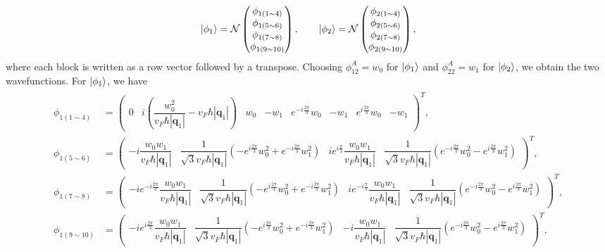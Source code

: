 \documentclass[10pt, oneside]{article}
\newcommand{\p}[1]{\left(#1\right)}
\newcommand{\bv}[1]{\left|#1\right|}
\begin{document}
\begin{align}
	\ket{\phi_1}
	=
	\mathcal{N}
	\begin{pmatrix}
		\phi_{1(1 \sim 4)} \\
		\phi_{1(5 \sim 6)} \\
		\phi_{1(7 \sim 8)} \\
		\phi_{1(9 \sim 10)}
	\end{pmatrix},
	\qquad
	\ket{\phi_2}
	=
	\mathcal{N}
	\begin{pmatrix}
		\phi_{2(1 \sim 4)} \\
		\phi_{2(5 \sim 6)} \\
		\phi_{2(7 \sim 8)} \\
		\phi_{2(9 \sim 10)}
	\end{pmatrix},
\end{align}
where each block is written as a row vector followed by a transpose. Choosing \(\phi_{12}^{A}=w_0\) for \(\ket{\phi_1}\) and \(\phi_{22}^{A}=w_1\) for \(\ket{\phi_2}\), we obtain the two wavefunctions. For \(\ket{\phi_1}\), we have
\begin{align}
	\begin{split}
		\phi_{1(1 \sim 4)}
	&=
	\begin{pmatrix}
		0 &
		i \p{\dfrac{w_{0}^{2}}{v_F \hbar \bv{\bm{q}_1}} - v_F \hbar \bv{\bm{q}_1}} &
		w_0 &
		- w_1 &
		e^{-i \frac{2\pi}{3}} w_0 &
		- w_1 &
		e^{i \frac{2\pi}{3}} w_0 &
		- w_1
	\end{pmatrix}^{T},
	\\[0.5em]
	\phi_{1(5 \sim 6)}
	&=
	\begin{pmatrix}
		- i \dfrac{w_0 w_1}{v_F \hbar \bv{\bm{q}_1}} &
		\dfrac{1}{\sqrt{3} v_F \hbar \bv{\bm{q}_1}}
		\p{- e^{i \frac{2\pi}{3}} w_{0}^{2} + e^{-i \frac{2\pi}{3}} w_{1}^{2}} &
		i e^{i \frac{\pi}{3}} \dfrac{w_0 w_1}{v_F \hbar \bv{\bm{q}_1}} &
		\dfrac{1}{\sqrt{3} v_F \hbar \bv{\bm{q}_1}}
		\p{e^{-i \frac{2\pi}{3}} w_{0}^{2} - e^{i \frac{2\pi}{3}} w_{1}^{2}}
	\end{pmatrix}^{T},
	\\[0.5em]
	\phi_{1(7 \sim 8)}
	&=
	\begin{pmatrix}
		- i e^{-i \frac{2\pi}{3}} \dfrac{w_0 w_1}{v_F \hbar \bv{\bm{q}_1}} &
		\dfrac{1}{\sqrt{3} v_F \hbar \bv{\bm{q}_1}}
		\p{- e^{i \frac{2\pi}{3}} w_{0}^{2} + e^{-i \frac{2\pi}{3}} w_{1}^{2}} &
		i e^{-i \frac{\pi}{3}} \dfrac{w_0 w_1}{v_F \hbar \bv{\bm{q}_1}} &
		\dfrac{1}{\sqrt{3} v_F \hbar \bv{\bm{q}_1}}
		\p{e^{-i \frac{2\pi}{3}} w_{0}^{2} - e^{i \frac{2\pi}{3}} w_{1}^{2}}
	\end{pmatrix}^{T},
	\\[0.5em]
	\phi_{1(9 \sim 10)}
	&=
	\begin{pmatrix}
		- i e^{i \frac{2\pi}{3}} \dfrac{w_0 w_1}{v_F \hbar \bv{\bm{q}_1}} &
		\dfrac{1}{\sqrt{3} v_F \hbar \bv{\bm{q}_1}}
		\p{- e^{i \frac{2\pi}{3}} w_{0}^{2} + e^{-i \frac{2\pi}{3}} w_{1}^{2}} &
		- i \dfrac{w_0 w_1}{v_F \hbar \bv{\bm{q}_1}} &
		\dfrac{1}{\sqrt{3} v_F \hbar \bv{\bm{q}_1}}
		\p{e^{-i \frac{2\pi}{3}} w_{0}^{2} - e^{i \frac{2\pi}{3}} w_{1}^{2}}
	\end{pmatrix}^{T}.
	\end{split}
\end{align}
\end{document}
